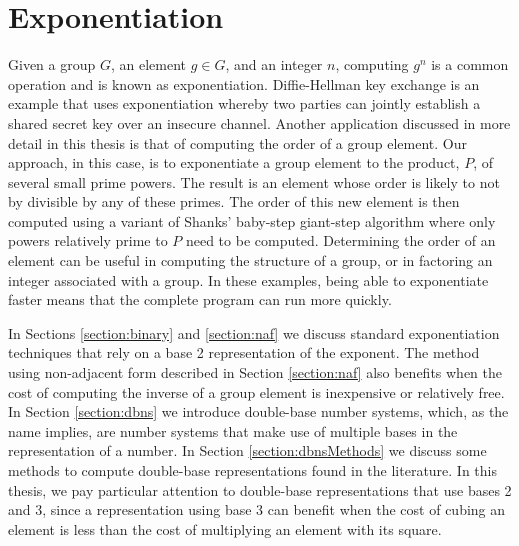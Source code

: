 \documentclass{ucalgthes1}
\theoremstyle{plain}
\theoremstyle{definition}
\begin{document}
\setcounter{chapter}{2}
\chapter{Exponentiation}

Given a group $G$, an element $g \in G$, and an integer $n$, computing $g^n$ is a common operation and is known as exponentiation.  Diffie-Hellman key exchange is an example that uses exponentiation whereby two parties can jointly establish a shared secret key over an insecure channel.  Another application discussed in more detail in this thesis is that of computing the order of a group element.  Our approach, in this case, is to exponentiate a group element to the product, $P$, of several small prime powers.  The result is an element whose order is likely to not by divisible by any of these primes. The order of this new element is then computed using a variant of Shanks' baby-step giant-step algorithm where only powers relatively prime to $P$ need to be computed.  Determining the order of an element can be useful in computing the structure of a group, or in factoring an integer associated with a group.  In these examples, being able to exponentiate faster means that the complete program can run more quickly.

In Sections \ref{section:binary} and \ref{section:naf} we discuss standard exponentiation techniques that rely on a base 2 representation of the exponent.  The method using non-adjacent form described in Section \ref{section:naf} also benefits when the cost of computing the inverse of a group element is inexpensive or relatively free.  In Section \ref{section:dbns} we introduce double-base number systems, which, as the name implies, are number systems that make use of multiple bases in the representation of a number. In Section \ref{section:dbnsMethods} we discuss some methods to compute double-base representations found in the literature.  In this thesis, we pay particular attention to double-base representations that use bases 2 and 3, since a representation using base 3 can benefit when the cost of cubing an element is less than the cost of multiplying an element with its square.


\bigbreak
\end{document}

